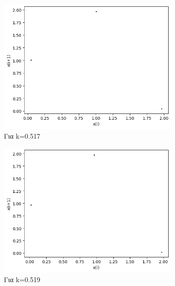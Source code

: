 \begin{figure}[h!]
\begin{subfigure}[b]{0.25\textwidth}
		\includegraphics[width=\textwidth]{LateX images/graphs/k0517}
		\caption{Για k=0.517}
	\end{subfigure}
	\hfill
	\begin{subfigure}[b]{0.25\textwidth}
		\centering
		\includegraphics[width=\textwidth]{LateX images/graphs/k0519}
		\caption{Για k=0.519}
		\label{f:k7}
	\end{subfigure}
	\hfill
	\begin{subfigure}[b]{0.25\textwidth}
		\centering

\end{subfigure}
\end{figure}
